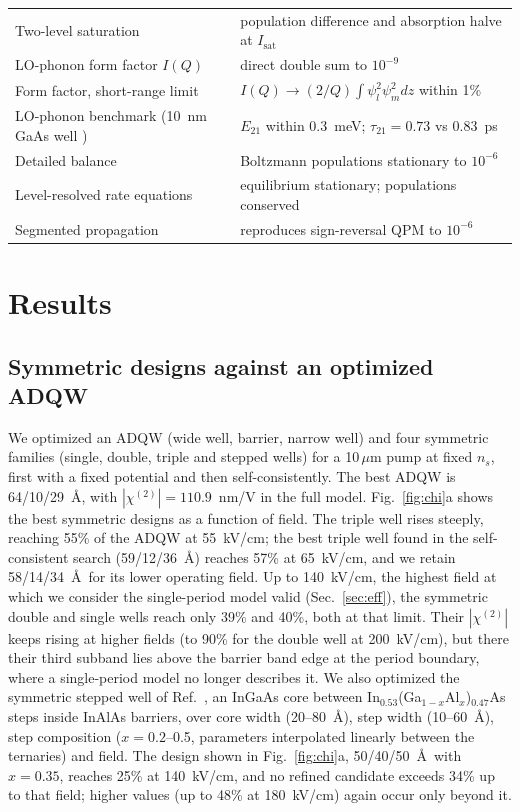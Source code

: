 \documentclass[11pt]{article}
\newcommand{\chitwo}{\chi^{(2)}}
\newcommand{\um}{\,\mu\mathrm{m}}
\begin{document}
\begin{table}[t]
\begin{tabular}{@{}ll@{}}
Two-level saturation & population difference and absorption halve at $I_\mathrm{sat}$ \\
LO-phonon form factor $I(Q)$ & direct double sum to $10^{-9}$ \\
Form factor, short-range limit & $I(Q)\to(2/Q)\int\psi_l^2\psi_m^2dz$ within 1\% \\
LO-phonon benchmark (10~nm GaAs well \cite{nextnano}) & $E_{21}$ within 0.3~meV; $\tau_{21}=0.73$ vs 0.83~ps \\
Detailed balance & Boltzmann populations stationary to $10^{-6}$ \\
Level-resolved rate equations & equilibrium stationary; populations conserved \\
Segmented propagation & reproduces sign-reversal QPM to $10^{-6}$ \\ \bottomrule
\end{tabular}
\end{table}

\section{Results}
\subsection{Symmetric designs against an optimized ADQW}
We optimized an ADQW (wide well, barrier, narrow well) and four symmetric families (single, double, triple and stepped wells) for a 10$\um$ pump at fixed $n_s$, first with a fixed potential and then self-consistently. The best ADQW is 64/10/29~\AA, with $|\chitwo|=110.9$~nm/V in the full model. Fig.~\ref{fig:chi}a shows the best symmetric designs as a function of field. The triple well rises steeply, reaching 55\% of the ADQW at 55~kV/cm; the best triple well found in the self-consistent search (59/12/36~\AA) reaches 57\% at 65~kV/cm, and we retain 58/14/34~\AA\ for its lower operating field. Up to 140~kV/cm, the highest field at which we consider the single-period model valid (Sec.~\ref{sec:eff}), the symmetric double and single wells reach only 39\% and 40\%, both at that limit. Their $|\chitwo|$ keeps rising at higher fields (to 90\% for the double well at 200~kV/cm), but there their third subband lies above the barrier band edge at the period boundary, where a single-period model no longer describes it. We also optimized the symmetric stepped well of Ref.~\cite{Patent5289309}, an InGaAs core between In$_{0.53}$(Ga$_{1-x}$Al$_x$)$_{0.47}$As steps inside InAlAs barriers, over core width (20--80~\AA), step width (10--60~\AA), step composition ($x=0.2$--0.5, parameters interpolated linearly between the ternaries) and field. The design shown in Fig.~\ref{fig:chi}a, 50/40/50~\AA\ with $x=0.35$, reaches 25\% at 140~kV/cm, and no refined candidate exceeds 34\% up to that field; higher values (up to 48\% at 180~kV/cm) again occur only beyond it.
\end{document}
